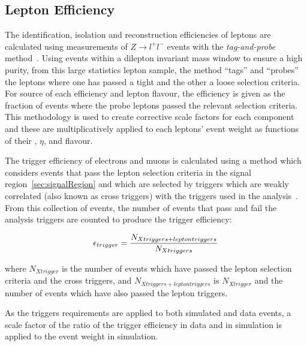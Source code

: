 \subsection{Lepton Efficiency}\label{subsec:leptonRecoSFs}
The identification, isolation and reconstruction efficiencies of leptons are calculated using measurements of $Z \rightarrow l^{+} l ^{-}$ events with the \emph{tag-and-probe} method~\cite{CMS:2008rxa}.
Using events within a dilepton invariant mass window to ensure a high purity, from this large statistics lepton sample, the method ``tags'' and ``probes'' the leptons where one has passed a tight and the other a loose selection criteria.
For source of each efficiency and lepton flavour, the efficiency is given as the fraction of events where the probe leptons passed the relevant selection criteria.
This methodology is used to create corrective scale factors for each component and these are multiplicatively applied to each leptons' event weight as functions of their \pt, $\eta$, and flavour.

The trigger efficiency of electrons and muons is calculated using a method which considers events that pass the lepton selection criteria in the signal region~\ref{sec:signalRegion} and which are selected by triggers which are weakly correlated (also known as cross triggers) with the triggers used in the analysis~\cite{Khachatryan:2016kzg}.
From this collection of events, the number of events that pass and fail the analysis triggers are counted to produce the trigger efficiency:

\begin{equation}
\epsilon_{trigger} = \frac{N_{X triggers + lepton triggers}}{N_{X triggers}} \\
\end{equation}

where $N_{X trigger}$ is the number of events which have passed the lepton selection criteria and the cross triggers, and $N_{X triggers + lepton triggers}$ is $N_{X trigger}$ and the number of events which have also passed the lepton triggers.

As the triggers requirements are applied to both simulated and data events, a scale factor of the ratio of the trigger efficiency in data and in simulation is applied to the event weight in simulation.


